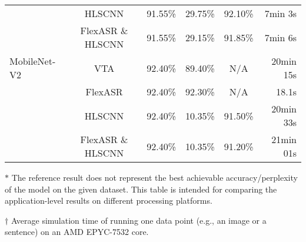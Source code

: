 \begin{table*}
\begin{small}
\begin{tabular}{|l|c|c|c|c|r|}
   &
    HLSCNN &
    91.55\% &
    \cellcolor[HTML]{E9CECE}29.75\% &
    \cellcolor[HTML]{DDEFDE}92.10\% &
    7min 3s \\
    
   &
    FlexASR \& HLSCNN & 
    91.55\% & 
    \cellcolor[HTML]{E9CECE}29.15\% & 
    \cellcolor[HTML]{DDEFDE}91.85\% & 
    7min 6s \\ 
    \hline

  MobileNet-V2 &
    VTA &
    92.40\% &
    89.40\% &
    N/A &
    20min 15s \\
  
   &
    FlexASR &
    92.40\% &
    92.30\% &
    N/A &
    18.1s \\

   & 
    HLSCNN & 
    92.40\% & 
    \cellcolor[HTML]{E9CECE}10.35\% & 
    \cellcolor[HTML]{DDEFDE}91.50\% & 
    20min 33s \\
    
   & 
    FlexASR \& HLSCNN & 
    92.40\% & 
    \cellcolor[HTML]{E9CECE}10.35\% & 
    \cellcolor[HTML]{DDEFDE}91.20\% & 
    21min 01s \\


    \hline
  \end{tabular}
  \end{small}
  \begin{tablenotes}
    \item $\ast$ The reference result does not represent the best achievable accuracy/perplexity of the model on the given dataset. This table is intended for comparing the application-level results on different processing platforms.
    \item $\dagger$ Average simulation time of running one data point (e.g., an image or a sentence) on an AMD EPYC-7532 core.
  \end{tablenotes}
\end{table*}
